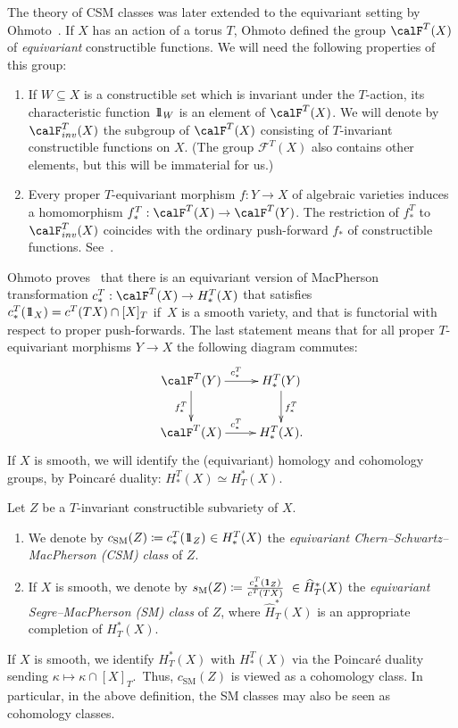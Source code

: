 \documentclass[11pt]{article}
\theoremstyle{definition}
\numberwithin{equation}{section}
\newcommand{\cF}{{\mathcal F}}
\newcommand{\csm}{c_{\mathrm{SM}}}
\newcommand{\ssm}{s_{\mathrm{M}}}
\newcommand{\one}{1\hskip-3.5pt1}
\begin{document}
The theory of CSM classes was later extended to the equivariant setting by Ohmoto~\cite{ohmoto:eqcsm}. If $X$ has an 
action of a torus $T$, Ohmoto defined the group $\calF^T(X)$ of {\em equivariant\/} constructible functions. 
We will need the following properties of this group: 
\begin{enumerate} 
	\item If $W \subseteq X$ is a constructible set which is invariant under the $T$-action, its characteristic function $\one_W$ is an element of $\calF^T(X)$. We will denote by $\calF_{inv}^{T}(X)$ the subgroup of $\calF^{T}(X)$ consisting of $T$-invariant constructible functions on $X$. (The group $\cF^T(X)$ also contains other elements, but this will be immaterial for us.)
	\item Every proper $T$-equivariant morphism $f: Y \to X$ of algebraic varieties induces a homomorphism $f_*^T: \calF^T(X) \to \calF^T(Y)$. The restriction of $f_*^T$ to $\calF_{inv}^{T}(X)$ coincides with the ordinary push-forward $f_*$ of constructible functions. See~\cite[\S 2.6]{ohmoto:eqcsm}.
\end{enumerate}

Ohmoto proves~\cite[Theorem 1.1]{ohmoto:eqcsm} that there is an equivariant version of MacPherson transformation $c_*^T: \calF^T(X) \to H_*^T(X)$ that satisfies $c_*^T(\one_X) = c^T(TX) \cap [X]_T$ if~$X$ is a smooth variety, and that is functorial with respect to proper push-forwards. The last statement means that for all proper $T$-equivariant morphisms $Y\to X$ the following diagram
commutes:
$$\xymatrix{ 
	\calF^T(Y) \ar[r]^{c_*^T} \ar[d]_{f_*^T} & H_*^T(Y) \ar[d]^{f_*^T} \\ 
	\calF^T(X) \ar[r]^{c_*^T} & H_*^T(X).}$$ 
If $X$ is smooth, we will identify the (equivariant) homology and cohomology groups, 
by Poincar{\'e} duality: $H_*^T(X)\simeq H^*_T(X)$.


\begin{defin}
	Let $Z$ be a $T$-invariant constructible subvariety of $X$. 
	\begin{enumerate}
		\item
		We denote by $\csm(Z)\coloneqq c_*^T(\one_{Z}) {~\in H_*^T(X)}$ the {\em equivariant Chern--Schwartz--MacPherson (CSM) class\/} of $Z$. 
		\item 
		If $X$ is smooth, we denote by $\ssm(Z)\coloneqq \frac{c_*^T(\one_{Z})}{c^T(T X)} ~\in \widehat{H}^*_T(X)$ 
		the {\em equivariant Segre--MacPherson (SM) class\/} of $Z$, where $\widehat{H}^*_T(X)$ is an appropriate completion
		of $H^*_T(X)$. 
	\end{enumerate}
\end{defin}
If $X$ is smooth,
we identify $H^*_T(X)$ with $H_*^T(X)$ via the Poincar\'e duality sending $\kappa \mapsto \kappa \cap [X]_T$.~Thus, $\csm(Z)$ is viewed as a cohomology class. In particular, in the above definition, the SM classes may also be seen as cohomology classes.
	
\end{document}
